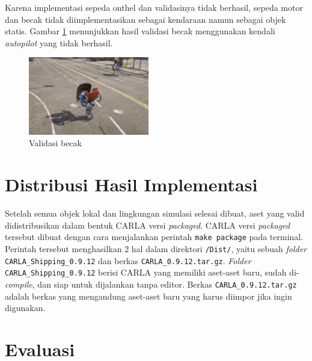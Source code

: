 Karena implementasi sepeda onthel dan validasinya tidak berhasil, sepeda motor
dan becak tidak diimplementasikan sebagai kendaraan namun sebagai objek statis.
Gambar \ref{fig:becak-validation} menunjukkan hasil validasi becak menggunakan
kendali \textit{autopilot} yang tidak berhasil.

\begin{figure}[!h]
    \centering
    \includegraphics[width=0.47\textwidth]{resources/chapter-4/testing-becak-generate.png}
    \caption{Validasi becak}
    \label{fig:becak-validation}
\end{figure}

\section{Distribusi Hasil Implementasi}

Setelah semua objek lokal dan lingkungan simulasi selesai dibuat, aset yang
valid didistribusikan dalam bentuk CARLA versi \textit{packaged}. CARLA versi
\textit{packaged} tersebut dibuat dengan cara menjalankan perintah \verb|make package|
pada terminal. Perintah tersebut menghasilkan 2 hal dalam direktori
\verb|/Dist/|, yaitu sebuah \textit{folder} \verb|CARLA_Shipping_0.9.12| dan
berkas \verb|CARLA_0.9.12.tar.gz|. \textit{Folder} \verb|CARLA_Shipping_0.9.12|
berisi CARLA yang memiliki aset-aset baru, sudah di-\textit{compile}, dan siap
untuk dijalankan tanpa editor. Berkas \verb|CARLA_0.9.12.tar.gz| adalah berkas
yang mengandung aset-aset baru yang harus diimpor jika ingin digunakan.

\section{Evaluasi}

